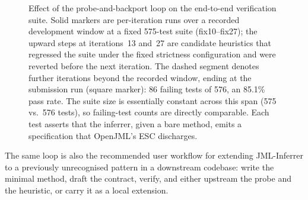 \begin{figure}[t]
\centering
{}
\caption{Effect of the probe-and-backport loop on the end-to-end verification suite. Solid markers are per-iteration runs over a recorded development window at a fixed 575-test suite (fix10--fix27); the upward steps at iterations~13 and~27 are candidate heuristics that regressed the suite under the fixed strictness configuration and were reverted before the next iteration. The dashed segment denotes further iterations beyond the recorded window, ending at the submission run (square marker): 86 failing tests of 576, an 85.1\% pass rate. The suite size is essentially constant across this span (575 vs.\ 576 tests), so failing-test counts are directly comparable. Each test asserts that the inferrer, given a bare method, emits a specification that OpenJML's ESC discharges.}
\label{fig:loop-progress}
\end{figure}

The same loop is also the recommended user workflow for extending JML-Inferrer to a previously unrecognised pattern in a downstream codebase: write the minimal method, draft the contract, verify, and either upstream the probe and the heuristic, or carry it as a local extension.
